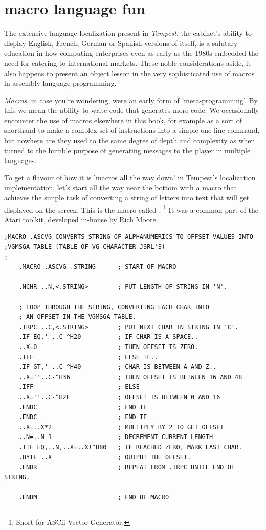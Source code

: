 \chapter{macro language fun}
\label{sec:listing}
\lstset{style=6502Style}
\lhead[tempest]{}

The extensive language localization present in \textit{Tempest}, the cabinet's
ability to display English, French, German or Spanish versions of itself, is a
salutary education in how computing enterprises even as early as the 1980s
embedded the need for catering to international markets. These noble
considerations aside, it also happens to present an object lesson in the very
sophisticated use of macros in assembly language programming.

\textit{Macros}, in case you're wondering, were an early form of 'meta-programming'.
By this we mean the ability to write code that generates more code. We occasionally
encounter the use of macros elsewhere in this book, for example as a sort of shorthand
to make a complex set of instructions into a simple one-line command, but nowhere are they used to the
same degree of depth and complexity as when turned to the humble purpose of generating
messages to the player in multiple languages.

To get a flavour of how it is 'macros all the way down' in Tempest's localization implementation,
let's start all the way near the bottom with a macro that achieves the simple task of converting
a string of letters into text that will get displayed on the screen. This is the macro called
.
\footnote{Short for ASCii Vector Generator.}
It was a common part of the Atari toolkit, developed in-house by Rich Moore.

\clearpage

\begin{lstlisting}
;MACRO .ASCVG CONVERTS STRING OF ALPHANUMERICS TO OFFSET VALUES INTO
;VGMSGA TABLE (TABLE OF VG CHARACTER JSRL'S)
;
    .MACRO .ASCVG .STRING      ; START OF MACRO

    .NCHR ..N,<.STRING>        ; PUT LENGTH OF STRING IN 'N'.

    ; LOOP THROUGH THE STRING, CONVERTING EACH CHAR INTO
    ; AN OFFSET IN THE VGMSGA TABLE.
    .IRPC ..C,<.STRING>        ; PUT NEXT CHAR IN STRING IN 'C'.
    .IF EQ,''..C-^H20          ; IF CHAR IS A SPACE..
    ..X=0                      ; THEN OFFSET IS ZERO.
    .IFF                       ; ELSE IF..
    .IF GT,''..C-^H40          ; CHAR IS BETWEEN A AND Z..
    ..X=''..C-^H36             ; THEN OFFSET IS BETWEEN 16 AND 48
    .IFF                       ; ELSE
    ..X=''..C-^H2F             ; OFFSET IS BETWEEN 0 AND 16
    .ENDC                      ; END IF
    .ENDC                      ; END IF
    ..X=..X*2                  ; MULTIPLY BY 2 TO GET OFFSET
    ..N=..N-1                  ; DECREMENT CURRENT LENGTH
    .IIF EQ,..N,..X=..X!^H80   ; IF REACHED ZERO, MARK LAST CHAR.
    .BYTE ..X                  ; OUTPUT THE OFFSET.
    .ENDR                      ; REPEAT FROM .IRPC UNTIL END OF STRING.

    .ENDM                      ; END OF MACRO
\end{lstlisting}

